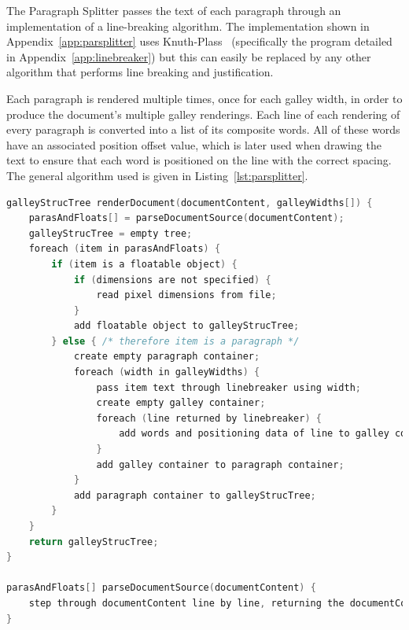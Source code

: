 The Paragraph Splitter passes the text of each paragraph through an implementation of a line-breaking algorithm. The implementation shown in Appendix~\ref{app:parsplitter} uses Knuth-Plass~\cite{Knuth1981} (specifically the program detailed in Appendix~\ref{app:linebreaker}) but this can easily be replaced by any other algorithm that performs line breaking and justification.

Each paragraph is rendered multiple times, once for each galley width, in order to produce the document's multiple galley renderings. Each line of each rendering of every paragraph is converted into a list of its composite words. All of these words have an associated position offset value, which is later used when drawing the text to ensure that each word is positioned on the line with the correct spacing. The general algorithm used is given in Listing~\ref{lst:parsplitter}.


\begin{lstlisting}[label=lst:parsplitter,language=c,captionpos=b,float,basicstyle=\ttfamily\footnotesize,caption={[Algorithm followed by the Paragraph Splitter]The algorithm followed by the Paragraph Splitter. Firstly the source of the document is parsed to break it into its initial logical blocks: one block per paragraph and one block per float, in the order encountered in the document source. These blocks are then processed further depending on their type. Floats may be probed for their pixel dimensions if no size was specified, and are then added to the Galley Structure Tree. Paragraphs have their content passed through a line breaking algorithm, once for each specified width.}]
galleyStrucTree renderDocument(documentContent, galleyWidths[]) {
    parasAndFloats[] = parseDocumentSource(documentContent);
    galleyStrucTree = empty tree;
    foreach (item in parasAndFloats) {
        if (item is a floatable object) {
            if (dimensions are not specified) {
                read pixel dimensions from file;
            }
            add floatable object to galleyStrucTree;
        } else { /* therefore item is a paragraph */
            create empty paragraph container;
            foreach (width in galleyWidths) {
                pass item text through linebreaker using width;
                create empty galley container;
                foreach (line returned by linebreaker) {
                    add words and positioning data of line to galley container;
                }
                add galley container to paragraph container;
            }
            add paragraph container to galleyStrucTree;
        }
    }
    return galleyStrucTree;
}

parasAndFloats[] parseDocumentSource(documentContent) {
    step through documentContent line by line, returning the documentContent broken into an array of strings with one element per paragraph and per floatable object;
}

\end{lstlisting}


